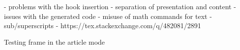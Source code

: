 - problems with the hook insertion
  - separation of presentation and content
- issues with the generated code
  - misuse of math commands for text 
- sub/superscripts - https://tex.stackexchange.com/q/482081/2891

\begin{frame}
  Testing frame in the article mode
\end{frame}
